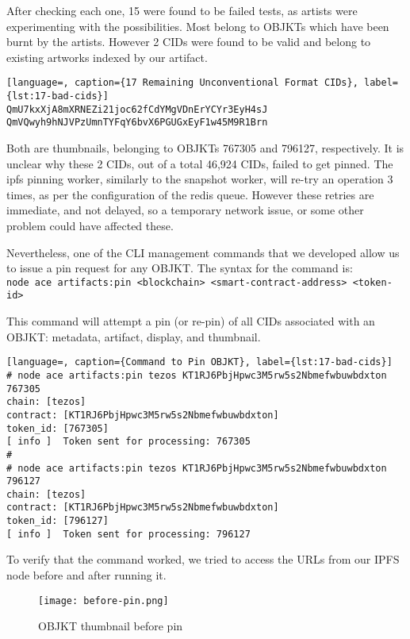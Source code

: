 After checking each one, 15 were found to be failed tests, as artists were experimenting with the possibilities. Most belong to OBJKTs which have been burnt by the artists. However 2 CIDs were found to be valid and belong to existing artworks indexed by our artifact.

\begin{lstlisting}[language=, caption={17 Remaining Unconventional Format CIDs}, label={lst:17-bad-cids}] 
QmU7kxXjA8mXRNEZi21joc62fCdYMgVDnErYCYr3EyH4sJ
QmVQwyh9hNJVPzUmnTYFqY6bvX6PGUGxEyF1w45M9R1Brn 
\end{lstlisting}

Both are thumbnails, belonging to OBJKTs 767305 and 796127, respectively. It is unclear why these 2 CIDs, out of a total 46,924 CIDs, failed to get pinned. The ipfs pinning worker, similarly to the snapshot worker, will re-try an operation 3 times, as per the configuration of the redis queue. However these retries are immediate, and not delayed, so a temporary network issue, or some other problem could have affected these.

Nevertheless, one of the CLI management commands that we developed allow us to issue a pin request for any OBJKT. The syntax for the command is:\\
{
\footnotesize{\texttt{node ace artifacts:pin <blockchain> <smart-contract-address> <token-id>}}\\
}


This command will attempt a pin (or re-pin) of all CIDs associated with an OBJKT: metadata, artifact, display, and thumbnail.
\begin{lstlisting}[language=, caption={Command to Pin OBJKT}, label={lst:17-bad-cids}] 
# node ace artifacts:pin tezos KT1RJ6PbjHpwc3M5rw5s2Nbmefwbuwbdxton 767305
chain: [tezos]
contract: [KT1RJ6PbjHpwc3M5rw5s2Nbmefwbuwbdxton]
token_id: [767305]
[ info ]  Token sent for processing: 767305
#
# node ace artifacts:pin tezos KT1RJ6PbjHpwc3M5rw5s2Nbmefwbuwbdxton 796127
chain: [tezos]
contract: [KT1RJ6PbjHpwc3M5rw5s2Nbmefwbuwbdxton]
token_id: [796127]
[ info ]  Token sent for processing: 796127
\end{lstlisting}

To verify that the command worked, we tried to access the URLs from our IPFS node before and after running it.


\begin{figure}[H]
    \centering
    \texttt{[image: before-pin.png]}
    \caption[OBJKT thumbnail before pin]{OBJKT thumbnail before pin}
    \label{fig:before-pin}
\end{figure}


